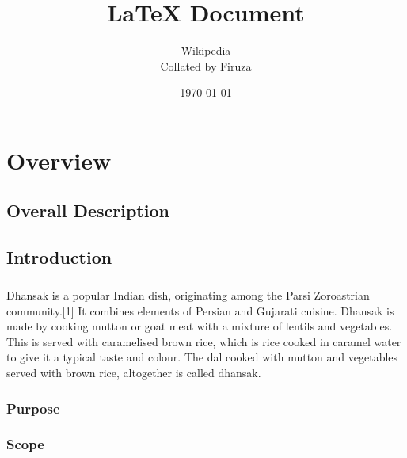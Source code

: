\documentclass{book}
\title{LaTeX Document}
\author{Wikipedia \\ Collated by Firuza}
\date{\today}
\begin{document}
	\maketitle
	\tableofcontents

	\chapter{Overview}

	\section{Overall Description}

	\section{Introduction}
	\paragraph{}
	Dhansak is a popular Indian dish, originating among the Parsi Zoroastrian community.[1] It combines elements of Persian and Gujarati cuisine. Dhansak is made by cooking mutton or goat meat with a mixture of lentils and vegetables. This is served with caramelised brown rice, which is rice cooked in caramel water to give it a typical taste and colour. The dal cooked with mutton and vegetables served with brown rice, altogether is called dhansak.
	
	\subsection{Purpose}
	
	\subsection{Scope}
	
	
\end{document}
